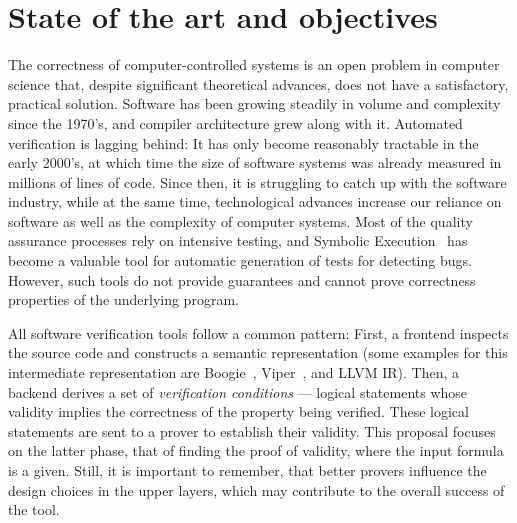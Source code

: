 \section{State of the art and objectives}

The correctness of computer-controlled systems is an open problem in computer science that, despite significant theoretical advances, does not have a satisfactory, practical solution.
Software has been growing steadily in volume and complexity since the 1970's, and compiler architecture grew along with it.
Automated verification is lagging behind: It has only become reasonably tractable in the early 2000's, at which time the size of software systems was already measured in millions of lines of code.
Since then, it is struggling to catch up with the software industry, while at the same time, technological advances increase our reliance on software as well as the complexity of computer systems.
Most of the quality assurance processes rely on intensive testing, and Symbolic Execution~\cite{CACM2013:Cadar} has become a valuable tool for automatic generation of tests for detecting bugs. 
However, such tools do not provide guarantees and cannot prove correctness properties of the underlying program.

All software verification tools follow a common pattern:
First, a frontend inspects the source code and constructs a semantic representation (some examples for this intermediate representation are Boogie~\cite{PASTE2005:Barnett}, Viper~\cite{VMCAI2016:Muller}, and LLVM IR).
Then, a backend derives a set of \emph{verification conditions} --- logical statements whose validity implies the correctness of the property being verified.
These logical statements are sent to a prover to establish their validity.
This proposal focuses on the latter phase, that of finding the proof of validity, where the input formula is a given.
Still, it is important to remember, that better provers influence the design choices in the upper layers, which may contribute to the overall success of the tool.

